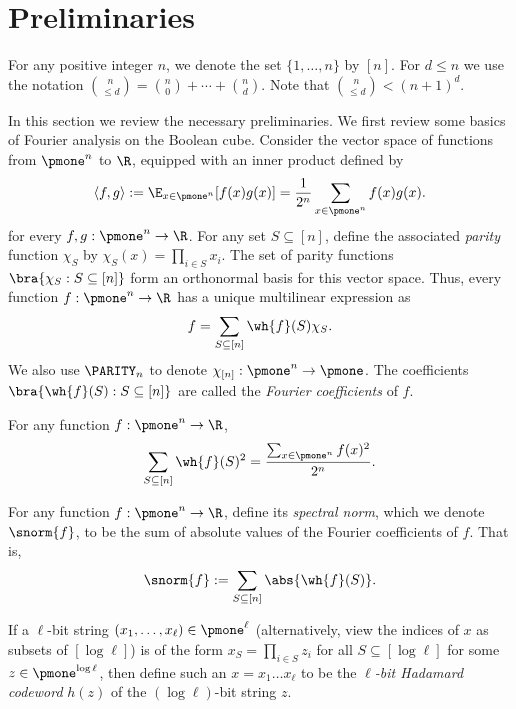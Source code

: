 \setcounter{section}{1}
\setcounter{theorem}{9}
\section{Preliminaries}\label{sec: prelims}
For any positive integer $n$, we denote the set $\{1, \dots, n\}$ by $[n]$. For $d \leq n$ we use the notation $\binom{n}{\leq d} = \binom{n}{0} + \cdots + \binom{n}{d}$. Note that $\binom{n}{\leq d} < (n+1)^d$.

In this section we review the necessary preliminaries.  We first review some basics of Fourier analysis on the Boolean cube.
Consider the vector space of functions from $\pmone^n$ to $\R$, equipped with an inner product defined by
\[
\langle f, g \rangle := \E_{x \in \pmone^n}[f(x)g(x)] = \frac{1}{2^n}\sum_{x \in \pmone^n}f(x)g(x).
\]
for every $f,g: \pmone^n \rightarrow \R$. For any set $S \subseteq [n]$, define the associated \emph{parity} function $\chi_S$ by $\chi_S(x) = \prod_{i \in S}x_i$. The set of parity functions $\bra{\chi_S : S \subseteq [n]}$ form an orthonormal basis for this vector space.  Thus, every function $f : \pmone^n \to \R$ has a unique multilinear expression as
\[
f = \sum_{S \subseteq [n]}\wh{f}(S)\chi_S.
\]
We also use $\PARITY_n$ to denote $\chi_{[n]}:\pmone^n\to\pmone$.
The coefficients $\bra{\wh{f}(S) : S \subseteq [n]}$ are called the \emph{Fourier coefficients} of $f$.
\begin{fact}\label{fact: parseval}
For any function $f : \pmone^n \to \R$,
\[
    \sum_{S \subseteq [n]}\wh{f}(S)^2 = \frac{\sum_{x \in \pmone^n}f(x)^2}{2^n}.
\]
\end{fact}

\begin{definition}\label{defn: wt}
For any function $f : \pmone^n \to \R$, define its \emph{spectral norm}, which we denote $\snorm{f}$, to be the sum of absolute values of the Fourier coefficients of $f$.  That is,
\[
\snorm{f} : = \sum_{S \subseteq [n]}\abs{\wh{f}(S)}.
\]
\end{definition}

\begin{definition}\label{defn: hcwd}
If a $\ell$-bit string $(x_1, \dots, x_{\ell}) \in \pmone^\ell$ (alternatively, view the indices of $x$ as subsets of $[\log\ell]$) is of the form $x_S = \prod_{i \in S}z_i$ for all $S \subseteq [\log \ell]$ for some $z \in \pmone^{\log \ell}$, then define such an $x = x_1 \dots x_\ell$ to be the \emph{$\ell$-bit Hadamard codeword} $h(z)$ of the $(\log \ell)$-bit string $z$.
\end{definition}

